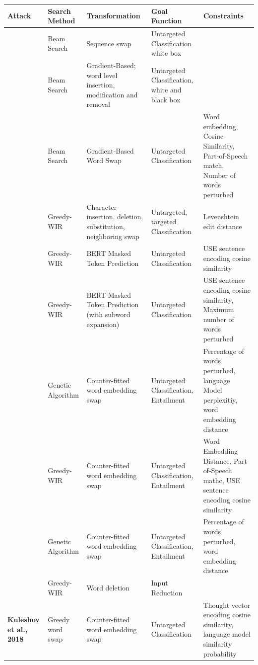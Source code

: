 \begin{table}
\begin{adjustwidth}{-0cm}{}
\small
\begin{tabular}{p{2cm}|p{2cm}p{3cm}p{2cm}p{4cm}}
\toprule
\textbf{Attack} &\textbf{Search Method} &\textbf{Transformation} &\textbf{Goal Function} &\textbf{Constraints}\\  
\midrule 
\textbf{\cite{papernot2016crafting}} & Beam Search &Sequence swap &Untargeted Classification white box & \\
\midrule
\textbf{\cite{liang2017deep}} &Beam Search &Gradient-Based; word level insertion, modification and removal &Untargeted Classification, white and black box & \\
\midrule
\textbf{\cite{ebrahimi2017hotflip}}&Beam Search &Gradient-Based Word Swap &Untargeted Classification &Word embedding, Cosine Similarity, Part-of-Speech match, Number of words perturbed \\
\midrule
\textbf{\cite{gao2018black}} &Greedy-WIR &Character insertion, deletion, substitution, neighboring swap&Untargeted, targeted Classification &Levenshtein edit distance \\
\midrule
\textbf{\cite{garg2020bae}} &Greedy-WIR &BERT Masked Token Prediction &Untargeted Classification &USE sentence encoding cosine similarity \\
\midrule
\textbf{\cite{zhang2020generating}}&Greedy-WIR &BERT Masked Token Prediction (with subword expansion) &Untargeted Classification &USE sentence encoding cosine similarity, Maximum number of words perturbed \\
\midrule
\textbf{\cite{alzantot2018generating}} &Genetic Algorithm &Counter-fitted word embedding swap &Untargeted Classification, Entailment &Percentage of words perturbed, language Model perplexitiy, word embedding distance \\
\midrule
\textbf{\cite{jin2019bert}}&Greedy-WIR &Counter-fitted word embedding swap &Untargeted Classification, Entailment &Word Embedding Distance, Part-of-Speech mathc, USE sentence encoding cosine similarity \\
\midrule
\textbf{\cite{wang2019natural}} &Genetic Algorithm &Counter-fitted word embedding swap &Untargeted Classification, Entailment &Percentage of words perturbed, word embedding distance \\
\midrule
\textbf{\cite{feng2018pathologies}} &Greedy-WIR &Word deletion &Input Reduction & \\
\midrule
\textbf{Kuleshov et al., 2018} &Greedy word swap &Counter-fitted word embedding swap &Untargeted Classification &Thought vector encoding cosine similarity, language model similarity probability 

\end{tabular}
\end{adjustwidth}
\end{table}

